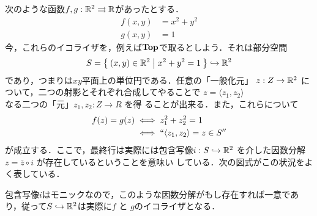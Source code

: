 \begin{example}
 次のような函数$f, g: \mathbb{R}^2 \rightrightarrows \mathbb{R}$があったとする．
 \begin{align*}
  f(x,y) &= x^2 + y^2\\
  g(x,y) &= 1
 \end{align*}
 今，これらのイコライザを，例えば${\bf Top}$で取るとしよう．それは部分空間
 \[
  S = \Set{(x, y) \in \mathbb{R}^2 | x^2 + y^2 = 1} \hookrightarrow \mathbb{R}^2
 \]
 であり，つまりは$xy$平面上の単位円である．任意の「一般化元」
 $z: Z \to \mathbb{R}^2$ について，二つの射影とそれぞれ合成してやることで
 $z = \langle z_1, z_2 \rangle$ なる二つの「元」$z_1, z_2: Z \to R$ を得
 ることが出来る．また，これらについて
 \begin{align*}
  f(z) = g(z) &\iff z_1^2 + z_2^2 = 1\\
              &\iff ``\langle z_1, z_2 \rangle = z \in S ''
 \end{align*}
 が成立する．ここで，最終行は実際には包含写像$i: S \hookrightarrow \mathbb{R}^2$
 を介した因数分解$z = \bar{z} \circ i$ が存在しているということを意味い
 している．次の図式がこの状況をよく表している．
 \begin{center}
 \end{center}
 包含写像$i$はモニックなので，このような因数分解がもし存在すれば一意であ
 り，従って$S \hookrightarrow \mathbb{R}^2$は実際に$f$ と $g$のイコライザとなる．
\end{example}

